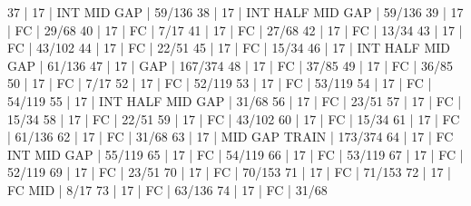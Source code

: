 37    |  17    |        INT                  MID  GAP         | 59/136   
38    |  17    |        INT  HALF            MID  GAP         | 59/136   
39    |  17    |    FC                                        | 29/68   
40    |  17    |    FC                                        | 7/17   
41    |  17    |    FC                                        | 27/68   
42    |  17    |    FC                                        | 13/34   
43    |  17    |    FC                                        | 43/102   
44    |  17    |    FC                                        | 22/51   
45    |  17    |    FC                                        | 15/34   
46    |  17    |        INT  HALF            MID  GAP         | 61/136   
47    |  17    |                                  GAP         | 167/374   
48    |  17    |    FC                                        | 37/85   
49    |  17    |    FC                                        | 36/85   
50    |  17    |    FC                                        | 7/17   
52    |  17    |    FC                                        | 52/119   
53    |  17    |    FC                                        | 53/119   
54    |  17    |    FC                                        | 54/119   
55    |  17    |        INT  HALF            MID  GAP         | 31/68   
56    |  17    |    FC                                        | 23/51   
57    |  17    |    FC                                        | 15/34   
58    |  17    |    FC                                        | 22/51   
59    |  17    |    FC                                        | 43/102   
60    |  17    |    FC                                        | 15/34   
61    |  17    |    FC                                        | 61/136   
62    |  17    |    FC                                        | 31/68   
63    |  17    |                             MID  GAP  TRAIN  | 173/374   
64    |  17    |    FC  INT                  MID  GAP         | 55/119   
65    |  17    |    FC                                        | 54/119   
66    |  17    |    FC                                        | 53/119   
67    |  17    |    FC                                        | 52/119   
69    |  17    |    FC                                        | 23/51   
70    |  17    |    FC                                        | 70/153   
71    |  17    |    FC                                        | 71/153   
72    |  17    |    FC                       MID              | 8/17   
73    |  17    |    FC                                        | 63/136   
74    |  17    |    FC                                        | 31/68   
